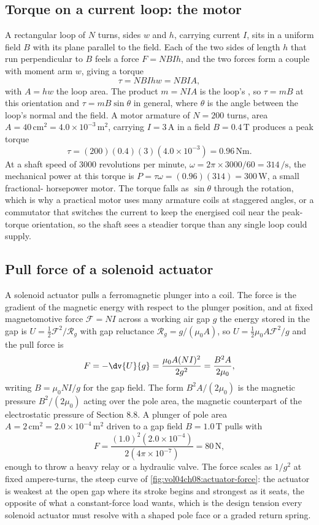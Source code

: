 \subsection{Torque on a current loop: the motor}

A rectangular loop of $N$ turns, sides $w$ and $h$, carrying current
$I$, sits in a uniform field $B$ with its plane parallel to the field.
Each of the two sides of length $h$ that run perpendicular to $B$ feels
a force $F = N B I h$, and the two forces form a couple with moment arm
$w$, giving a torque
\[
\tau = N B I h w = N B I A,
\]
with $A = hw$ the loop area. The product $m = N I A$ is the loop's
, so $\tau = m B$ at this orientation
and $\tau = m B\sin\theta$ in general, where $\theta$ is the angle
between the loop's normal and the field. A motor armature of $N = 200$
turns, area $A = 40\,\si{\centi\meter\squared} = 4.0\times 10^{-3}\,\si{
\meter\squared}$, carrying $I = 3\,\si{\ampere}$ in a field $B = 0.4\,
\si{\tesla}$ produces a peak torque
\[
\tau = (200)(0.4)(3)(4.0\times 10^{-3}) = 0.96\,\si{\newton\meter}.
\]
At a shaft speed of $3000$ revolutions per minute, $\omega = 2\pi\times
3000/60 = 314\,\si{\per\second}$, the mechanical power at this torque is
$P = \tau\omega = (0.96)(314) = 300\,\si{\watt}$, a small fractional-
horsepower motor. The torque falls as $\sin\theta$ through the rotation,
which is why a practical motor uses many armature coils at staggered
angles, or a commutator that switches the current to keep the
energised coil near the peak-torque orientation, so the shaft sees a
steadier torque than any single loop could supply.

\subsection{Pull force of a solenoid actuator}

A solenoid actuator pulls a ferromagnetic plunger into a coil. The force
is the gradient of the magnetic energy with respect to the plunger
position, and at fixed magnetomotive force $\mathcal{F} = NI$ across a
working air gap $g$ the energy stored in the gap is $U = \tfrac12
\mathcal{F}^{2}/\mathcal{R}_g$ with gap reluctance $\mathcal{R}_g = g/
(\mu_0 A)$, so $U = \tfrac12\mu_0 A\mathcal{F}^{2}/g$ and the pull force
is
\[
F = -\dv{U}{g} = \frac{\mu_0 A (NI)^{2}}{2 g^{2}} = \frac{B^{2} A}{2
\mu_0},
\]
writing $B = \mu_0 NI/g$ for the gap field. The form $B^2 A/(2\mu_0)$ is
the magnetic pressure $B^2/(2\mu_0)$ acting over the pole area, the
magnetic counterpart of the electrostatic pressure of Section 8.8. A
plunger of pole area $A = 2\,\si{\centi\meter\squared} = 2.0\times
10^{-4}\,\si{\meter\squared}$ driven to a gap field $B = 1.0\,\si{\tesla}
$ pulls with
\[
F = \frac{(1.0)^{2}(2.0\times 10^{-4})}{2(4\pi\times 10^{-7})} = 80\,
\si{\newton},
\]
enough to throw a heavy relay or a hydraulic valve. The force scales as
$1/g^2$ at fixed ampere-turns, the steep curve of
\cref{fig:vol04ch08:actuator-force}: the actuator is weakest at the open
gap where its stroke begins and strongest as it seats, the opposite of
what a constant-force load wants, which is the design tension every
solenoid actuator must resolve with a shaped pole face or a graded
return spring.

